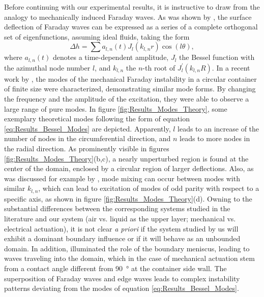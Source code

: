 \documentclass{jfm_arxiv}
\begin{document}
Before continuing with our experimental results, it is instructive to draw from the analogy to mechanically induced Faraday waves. 
As was shown by \citet{Benjamin1954}, the surface deflection of Faraday waves can be expressed as a series of a complete orthogonal set of eigenfunctions, assuming ideal fluids, taking the form
\begin{equation}
\label{eq:Results_Bessel_Modes}
\Delta h = \sum a_{l,n}(t) J_l\left( k_{l,n} r \right) \cos \left( l \theta \right),
\end{equation}
where $a_{l,n}(t)$ denotes a time-dependent amplitude, $J_l$ the Bessel function with the azimuthal node number $l$, and $k_{l,n}$ the $n$-th root of $J_l^\prime \left( k_{l,n} R \right)$.
In a recent work by \citet{Shao2021}, the modes of the mechanical Faraday instability in a circular container of finite size were characterized, demonstrating similar mode forms. By changing the frequency and the amplitude of the excitation, they were able to observe a large range of pure modes.
In  figure \ref{fig:Results_Modes_Theory}, some exemplary theoretical modes following the form of equation \eqref{eq:Results_Bessel_Modes} are depicted. Apparently, $l$ leads to an increase of the number of nodes in the circumferential direction, and $n$ leads to more nodes in the radial direction. As prominently visible in figures \ref{fig:Results_Modes_Theory}(b,c), a nearly unperturbed region is found at the center of the domain, enclosed by a circular region of larger deflections.
Also, as was discussed for example by \citet{Ciliberto1984}, mode mixing can occur between modes with similar $k_{l,n}$, which can lead to excitation of modes of odd parity with respect to a specific axis, as shown in figure \ref{fig:Results_Modes_Theory}(d).
Owning to the substantial differences between the corresponding systems studied in the literature and our system (air vs. liquid as the upper layer; mechanical vs. electrical actuation), it is not clear \textit{a priori} if the system studied by us will exhibit a dominant boundary influence or if it will behave as an unbounded domain.
In addition, \citet{Shao2021} illuminated the role of the boundary meniscus, leading to waves traveling into the domain, which in the case of mechanical actuation stem from a contact angle different from \SI{90}{\degree} at the container side wall. The superposition of Faraday waves and edge waves leads to complex instability patterns deviating from the modes of equation \ref{eq:Results_Bessel_Modes}. 
\end{document}
